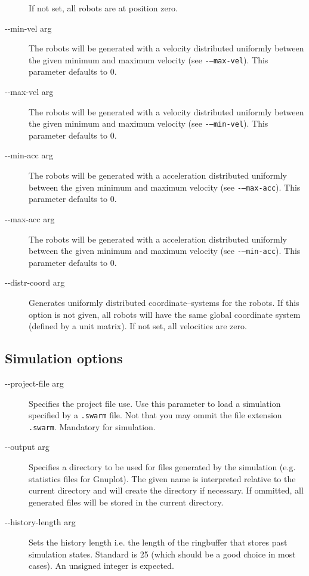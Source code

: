 \documentclass[a4paper,halfparskip,11pt,twoside]{scrartcl}
\begin{document}
\begin{description}
 If not set, all robots are at position zero.
	\item [-{}-min-vel arg] The robots will be generated with a velocity distributed uniformly between the given minimum and maximum velocity (see {\tt -{}---max-vel}). This parameter defaults to 0.
	\item [-{}-max-vel arg] The robots will be generated with a velocity distributed uniformly between the given minimum and maximum velocity (see {\tt -{}---min-vel}). This parameter defaults to 0.
	\item [-{}-min-acc arg] The robots will be generated with a acceleration distributed uniformly between the given minimum and maximum velocity (see {\tt -{}---max-acc}). This parameter defaults to 0.
	\item [-{}-max-acc arg] The robots will be generated with a acceleration distributed uniformly between the given minimum and maximum velocity (see {\tt -{}---min-acc}). This parameter defaults to 0.
	\item [-{}-distr-coord arg] Generates uniformly distributed coordinate--systems for the robots. If this option is not given, all robots will have the same global coordinate system (defined by a unit matrix).
 If not set, all velocities are zero.
\end{description}

\subsection{Simulation options}
\begin{description}
	\item [-{}-project-file arg] Specifies the project file use. Use this parameter to load a simulation specified by a {\tt .swarm} file. Not that you may ommit the file extension {\tt .swarm}. Mandatory for simulation.
	\item [-{}-output arg] Specifies a directory to be used for files generated by the simulation (e.g. statistics files for Gnuplot). The given name is interpreted relative to the current directory and will create the directory if necessary. If ommitted, all generated files will be stored in the current directory.
	\item [-{}-history-length arg] Sets the history length i.e. the length of the ringbuffer that stores past simulation states. Standard is 25 (which should be a good choice in most cases). An unsigned integer is expected.
\end{description}
\end{document}
